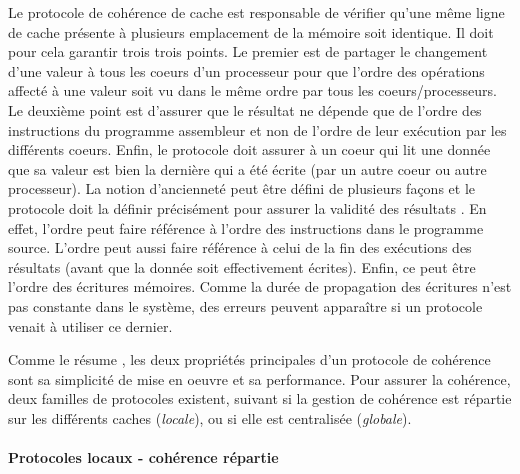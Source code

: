 Le protocole de cohérence de cache est responsable de vérifier qu'une même ligne de cache présente à plusieurs emplacement de la mémoire soit identique. Il doit pour cela garantir trois trois points. Le premier est de partager le changement d'une valeur à tous les coeurs d'un processeur pour que l'ordre des opérations affecté à une valeur soit vu dans le même ordre par tous les coeurs/processeurs. Le deuxième point est d'assurer que le résultat ne dépende que de l'ordre des instructions du programme assembleur et non de l'ordre de leur exécution par les différents coeurs. Enfin, le protocole doit assurer à un coeur qui lit une donnée que sa valeur est bien la dernière qui a été écrite (par un autre coeur ou autre processeur). La notion d'ancienneté peut être défini de plusieurs façons et le protocole doit la définir précisément pour assurer la validité des résultats \cite{Blanchet2013}. En effet, l'ordre peut faire référence à l'ordre des instructions dans le programme source. L'ordre peut aussi faire référence à celui de la fin des exécutions des résultats (avant que la donnée soit effectivement écrites). Enfin, ce peut être l'ordre des écritures mémoires. Comme la durée de propagation des écritures n'est pas constante dans le système, des erreurs peuvent apparaître si un protocole venait à utiliser ce dernier.

Comme le résume \cite{Blanchet2013}, les deux propriétés principales d'un protocole de cohérence sont sa simplicité de mise en oeuvre et sa performance. Pour assurer la cohérence, deux familles de protocoles existent, suivant si la gestion de cohérence est répartie sur les différents caches (\textit{locale}), ou si elle est centralisée (\textit{globale}). 



\paragraph{Protocoles locaux - cohérence répartie}

